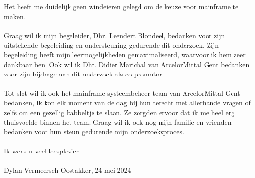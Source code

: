 Het heeft me duidelijk geen windeieren gelegd om de keuze voor mainframe te maken. 
\\ \\
Graag wil ik mijn begeleider, Dhr. Leendert Blondeel, bedanken voor zijn uitstekende begeleiding en ondersteuning gedurende dit onderzoek. 
Zijn begeleiding heeft mijn leermogelijkheden gemaximaliseerd, waarvoor ik hem zeer dankbaar ben. 
Ook wil ik Dhr. Didier Marichal van ArcelorMittal Gent bedanken voor zijn bijdrage aan dit onderzoek als co-promotor. 
\\ \\
Tot slot wil ik ook het mainframe systeembeheer team van ArcelorMittal Gent bedanken, ik kon elk moment van de dag bij hun terecht met allerhande vragen of zelfs om een gezellig babbeltje te slaan. 
Ze zorgden ervoor dat ik me heel erg thuisvoelde binnen het team. 
Graag wil ik ook nog mijn familie en vrienden bedanken voor hun steun gedurende mijn onderzoeksproces. 
\\ \\
Ik wens u veel leesplezier.
\\ \\
Dylan Vermeersch
Oostakker, 24 mei 2024